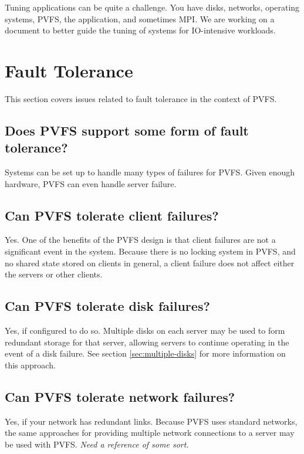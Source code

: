 \documentclass[11pt,letterpaper]{article}
\begin{document}
Tuning applications can be quite a challenge.  You have disks, networks,
operating systems, PVFS, the application, and sometimes MPI.  We are
working on a document to better guide the tuning of systems for
IO-intensive workloads.


%
%
\section{Fault Tolerance}
\label{sec:fault-tolerance}

This section covers issues related to fault tolerance in the context of PVFS.

\subsection{Does PVFS support some form of fault tolerance?}

Systems can be set up to handle many types of failures for PVFS.  Given enough
hardware, PVFS can even handle server failure.

\subsection{Can PVFS tolerate client failures?}

Yes.  One of the benefits of the PVFS design is that client failures are not a
significant event in the system.  Because there is no locking system in PVFS,
and no shared state stored on clients in general, a client failure does not
affect either the servers or other clients.

\subsection{Can PVFS tolerate disk failures?}

Yes, if configured to do so.  Multiple disks on each server may be used to
form redundant storage for that server, allowing servers to continue operating
in the event of a disk failure.  See section \ref{sec:multiple-disks} for more
information on this approach.

\subsection{Can PVFS tolerate network failures?}

Yes, if your network has redundant links.  Because PVFS uses standard
networks, the same approaches for providing multiple network connections to a
server may be used with PVFS.  \emph{Need a reference of some sort.}
\end{document}
